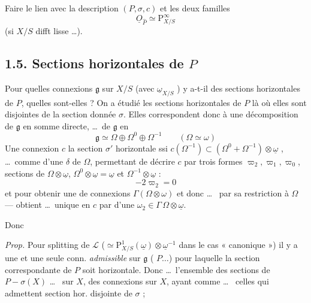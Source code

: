 \documentclass[11pt,a4paper]{article}
\begin{document}
Faire le lien avec la description $(P,\sigma,c)$ et les deux familles
\[
\underline{O}_{\hat{P}} \simeq \mathrm{P}^{\infty}_{X/S}
\]
(si $X/S$ difft lisse \ldots).

\subsection{1.5. Sections horizontales de $P$}

Pour quelles connexions $\mathfrak{g}$  sur $X/S$ (avec $\underline{\omega}_{X/S}$ ) y a-t-il des sections horizontales de $P$,  quelles sont-elles ? On a étudié  les sections horizontales de $P$ là où elles sont disjointes de la section donnée $\sigma$. Elles correspondent donc à une décomposition de $\mathfrak{g}$ en somme directe, \ldots\ de $\mathfrak{g}$ en
\[
\mathfrak{g} \simeq \Omega \oplus \Omega^0 \oplus \Omega^{-1} \qquad (\Omega\simeq\omega)
\]
 Une connexion $c$  la section $\sigma'$ horizontale  ssi $c(\Omega^{-1}) \subset (\Omega^0 + \Omega^{-1})\otimes\underline{\omega}$ , \ldots\ comme      d'une   $\delta$ de $\Omega$, permettant de décrire $c$ par trois formes $\varpi_2, \varpi_1, \varpi_0$, sections de $\Omega\otimes\underline{\omega}$, $\Omega^0\otimes\underline{\omega} = \underline{\omega}$ et $\Omega^{-1}\otimes\underline{\omega}$ :
\[
-2\varpi_2 = 0
\]
 et pour \ill{} obtenir  une \ill{} de connexions  $\Gamma(\Omega\otimes\omega)$ et donc \ldots\  \ill{} par sa restriction à $\Omega$ ---   obtient  \ldots\ unique en  $c$ par  d'une $\omega_2\in\Gamma\,\Omega\otimes\underline{\omega}$.

Donc

\emph{Prop.} Pour  splitting de  $\mathcal{L}$ ($\simeq \mathrm{P}^1_{X/S}(\underline{\omega})\otimes\underline{\omega}^{-1}$ dans le cas « canonique ») il y a une et une seule conn. \emph{admissible} sur $\mathfrak{g}$ ( $P\ldots$) pour laquelle la section correspondante de $P$ soit horizontale. Donc  \add{\ill{}} \ldots\ l'ensemble des sections de $P - \sigma(X)$ \struck{\ill{}}   \ldots\  sur $X$, \struck{\ill{}}  des connexions \struck{\ill{}}  sur $X$, ayant comme \ldots\  celles qui admettent  section hor. disjointe de $\sigma$ ;
\end{document}
